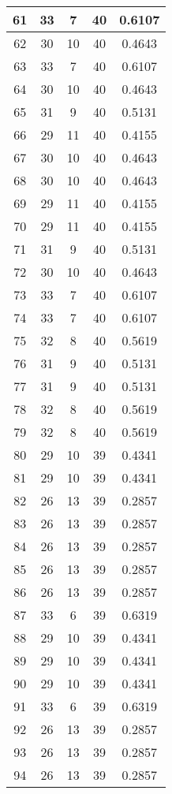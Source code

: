 \documentclass[letterpaper, 12pt]{article}
\begin{document}
\begin{longtable}{|c|c|c|c|c|}
61 & 33 & 7 & 40 & 0.6107 \\
\hline
62 & 30 & 10 & 40 & 0.4643 \\
\hline
63 & 33 & 7 & 40 & 0.6107 \\
\hline
64 & 30 & 10 & 40 & 0.4643 \\
\hline
65 & 31 & 9 & 40 & 0.5131 \\
\hline
66 & 29 & 11 & 40 & 0.4155 \\
\hline
67 & 30 & 10 & 40 & 0.4643 \\
\hline
68 & 30 & 10 & 40 & 0.4643 \\
\hline
69 & 29 & 11 & 40 & 0.4155 \\
\hline
70 & 29 & 11 & 40 & 0.4155 \\
\hline
71 & 31 & 9 & 40 & 0.5131 \\
\hline
72 & 30 & 10 & 40 & 0.4643 \\
\hline
73 & 33 & 7 & 40 & 0.6107 \\
\hline
74 & 33 & 7 & 40 & 0.6107 \\
\hline
75 & 32 & 8 & 40 & 0.5619 \\
\hline
76 & 31 & 9 & 40 & 0.5131 \\
\hline
77 & 31 & 9 & 40 & 0.5131 \\
\hline
78 & 32 & 8 & 40 & 0.5619 \\
\hline
79 & 32 & 8 & 40 & 0.5619 \\
\hline
80 & 29 & 10 & 39 & 0.4341 \\
\hline
81 & 29 & 10 & 39 & 0.4341 \\
\hline
82 & 26 & 13 & 39 & 0.2857 \\
\hline
83 & 26 & 13 & 39 & 0.2857 \\
\hline
84 & 26 & 13 & 39 & 0.2857 \\
\hline
85 & 26 & 13 & 39 & 0.2857 \\
\hline
86 & 26 & 13 & 39 & 0.2857 \\
\hline
87 & 33 & 6 & 39 & 0.6319 \\
\hline
88 & 29 & 10 & 39 & 0.4341 \\
\hline
89 & 29 & 10 & 39 & 0.4341 \\
\hline
90 & 29 & 10 & 39 & 0.4341 \\
\hline
91 & 33 & 6 & 39 & 0.6319 \\
\hline
92 & 26 & 13 & 39 & 0.2857 \\
\hline
93 & 26 & 13 & 39 & 0.2857 \\
\hline
94 & 26 & 13 & 39 & 0.2857 \\
\hline

\end{longtable}
\end{document}

